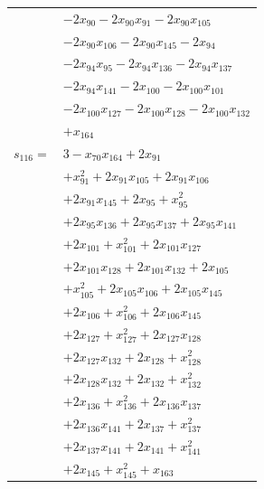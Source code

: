 \begin{longtable}{@{}r@{\;}l@{}}
 & \(\displaystyle -2x_{90} -2x_{90}x_{91} -2x_{90}x_{105}\) \\
 & \(\displaystyle -2x_{90}x_{106} -2x_{90}x_{145} -2x_{94}\) \\
 & \(\displaystyle -2x_{94}x_{95} -2x_{94}x_{136} -2x_{94}x_{137}\) \\
 & \(\displaystyle -2x_{94}x_{141} -2x_{100} -2x_{100}x_{101}\) \\
 & \(\displaystyle -2x_{100}x_{127} -2x_{100}x_{128} -2x_{100}x_{132}\) \\
 & \(\displaystyle +x_{164}\) \\[3pt]
\(s_{116}=\) & \(\displaystyle 3 -x_{70}x_{164} +2x_{91}\) \\
 & \(\displaystyle +x_{91}^{2} +2x_{91}x_{105} +2x_{91}x_{106}\) \\
 & \(\displaystyle +2x_{91}x_{145} +2x_{95} +x_{95}^{2}\) \\
 & \(\displaystyle +2x_{95}x_{136} +2x_{95}x_{137} +2x_{95}x_{141}\) \\
 & \(\displaystyle +2x_{101} +x_{101}^{2} +2x_{101}x_{127}\) \\
 & \(\displaystyle +2x_{101}x_{128} +2x_{101}x_{132} +2x_{105}\) \\
 & \(\displaystyle +x_{105}^{2} +2x_{105}x_{106} +2x_{105}x_{145}\) \\
 & \(\displaystyle +2x_{106} +x_{106}^{2} +2x_{106}x_{145}\) \\
 & \(\displaystyle +2x_{127} +x_{127}^{2} +2x_{127}x_{128}\) \\
 & \(\displaystyle +2x_{127}x_{132} +2x_{128} +x_{128}^{2}\) \\
 & \(\displaystyle +2x_{128}x_{132} +2x_{132} +x_{132}^{2}\) \\
 & \(\displaystyle +2x_{136} +x_{136}^{2} +2x_{136}x_{137}\) \\
 & \(\displaystyle +2x_{136}x_{141} +2x_{137} +x_{137}^{2}\) \\
 & \(\displaystyle +2x_{137}x_{141} +2x_{141} +x_{141}^{2}\) \\
 & \(\displaystyle +2x_{145} +x_{145}^{2} +x_{163}\) \\[3pt]
\end{longtable}
\endgroup
